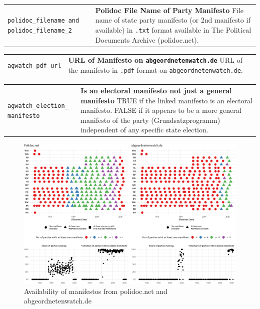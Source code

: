 \documentclass[
]{scrartcl}
\begin{document}
\begin{longtable}{p{3.2cm}| p{11cm}}
\texttt{polidoc\_filename and polidoc\_filename\_2} &\textbf{Polidoc File Name of Party Manifesto}\newline 
File name of state party manifesto (or 2nd manifesto if available) in \texttt{.txt} format available in The Political Documents Archive (polidoc.net).
\end{longtable}

\begin{longtable}{p{3.2cm}| p{11cm}}
\texttt{agwatch\_pdf\_url} &\textbf{URL of Manifesto on \texttt{abgeordnetenwatch.de}}\newline 
URL of the manifesto in \texttt{.pdf} format on \texttt{abgeordnetenwatch.de}.
\end{longtable}

\begin{longtable}{p{3.2cm}| p{11cm}}
\texttt{agwatch\_election\_
manifesto} &\textbf{Is an electoral manifesto not just a general manifesto}\newline 
TRUE if the linked manifesto is an electoral manifesto. FALSE if it appears to be a more general manifesto of the party (Grundsatzprogramm) independent of any specific state election.
\end{longtable}

\newpage

\begin{landscape}

\begin{figure}

{\centering \includegraphics{cbfiles/printmanifestoplot-1} 

}

\caption{\label{figure:manifestoavailability}Availability of manifestos from polidoc.net and abgeordnetenwatch.de}\label{fig:printmanifestoplot}
\end{figure}

\end{landscape}
\end{document}

